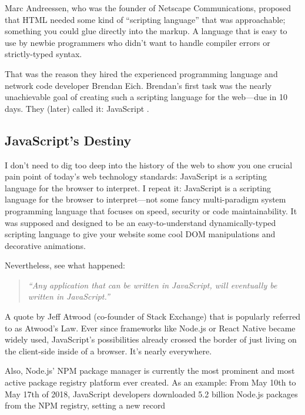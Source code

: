 \documentclass[10pt]{article}  %
\begin{document}
\begin{sloppypar}
  Marc Andreessen, who was the founder of Netscape Communications, proposed that HTML needed some kind of “scripting language” that was approachable; something you could glue directly into the markup. A language that is easy to use by newbie programmers who didn’t want to handle compiler errors or strictly-typed syntax.

  That was the reason they hired the experienced programming language and network code developer Brendan Eich. Brendan’s first task was the nearly unachievable goal of creating such a scripting language for the web—due in 10 days. They (later) called it: JavaScript \citep{severance_javascript_2012}.

  \subsection{JavaScript’s Destiny}
  \label{sec:javascript-destiny}

  I don’t need to dig too deep into the history of the web to show you one crucial pain point of today’s web technology standards: JavaScript is a scripting language for the browser to interpret. I repeat it: JavaScript is a scripting language for the browser to interpret—not some fancy multi-paradigm system programming language that focuses on speed, security or code maintainability. It was supposed and designed to be an easy-to-understand dynamically-typed scripting language to give your website some cool DOM manipulations and decorative animations.

  Nevertheless, see what happened:

  \begin{quote}
    \emph{``Any application that can be written in JavaScript, will eventually be written in JavaScript.'' \citep{atwood_principle_2007}}
  \end{quote}

  A quote by Jeff Atwood (co-founder of Stack Exchange) that is popularly referred to as Atwood’s Law. Ever since frameworks like Node.js or React Native became widely used, JavaScript’s possibilities already crossed the border of just living on the client-side inside of a browser. It’s nearly everywhere.

  Also, Node.js’ NPM package manager is currently the most prominent and most active package registry platform ever created. As an example: From May 10th to May 17th of 2018, JavaScript developers downloaded 5.2 billion Node.js packages from the NPM registry, setting a new record \citep{npm_how_2018}


\end{sloppypar}
\end{document}

